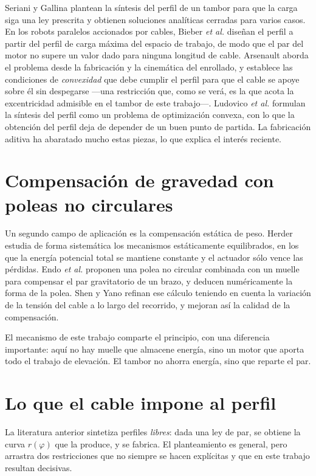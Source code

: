 Seriani y Gallina \cite{seriani2016} plantean la síntesis del
perfil de un tambor para que la carga siga una ley prescrita y obtienen soluciones analíticas
cerradas para varios casos. En los robots paralelos accionados por cables, Bieber \emph{et al.}
\cite{bieber2023} diseñan el perfil a partir del perfil de carga máxima del espacio de trabajo, de
modo que el par del motor no supere un valor dado para ninguna longitud de cable. Arsenault
\cite{arsenault2018} aborda el problema desde la fabricación y la cinemática del enrollado, y
establece las condiciones de \emph{convexidad} que debe cumplir el perfil para que el cable se
apoye sobre él sin despegarse ---una restricción que, como se verá, es la que acota la excentricidad
admisible en el tambor de este trabajo---. Ludovico \emph{et al.} \cite{ludovico2021} formulan la
síntesis del perfil como un problema de optimización convexa, con lo que la obtención del perfil
deja de depender de un buen punto de partida. La fabricación aditiva ha abaratado mucho estas
piezas, lo que explica el interés reciente.

\section{Compensación de gravedad con poleas no circulares}

Un segundo campo de aplicación es la compensación estática de peso. Herder \cite{herder2001} estudia
de forma sistemática los mecanismos estáticamente equilibrados, en los que la energía potencial
total se mantiene constante y el actuador sólo vence las pérdidas. Endo \emph{et al.}
\cite{endo2010} proponen una polea no circular combinada con un muelle para compensar el par
gravitatorio de un brazo, y deducen numéricamente la forma de la polea. Shen y Yano \cite{shen2022}
refinan ese cálculo teniendo en cuenta la variación de la tensión del cable a lo largo del
recorrido, y mejoran así la calidad de la compensación.

El mecanismo de este trabajo comparte el principio, con una diferencia importante: aquí no hay
muelle que almacene energía, sino un motor que aporta todo el trabajo de elevación. El tambor no
ahorra energía, sino que reparte el par.

\section{Lo que el cable impone al perfil}
\label{sec:arte-convexidad}

La literatura anterior sintetiza perfiles \emph{libres}: dada una ley de par, se obtiene la curva
$r(\varphi)$ que la produce, y se fabrica. El planteamiento es general, pero arrastra dos
restricciones que no siempre se hacen explícitas y que en este trabajo resultan decisivas.

